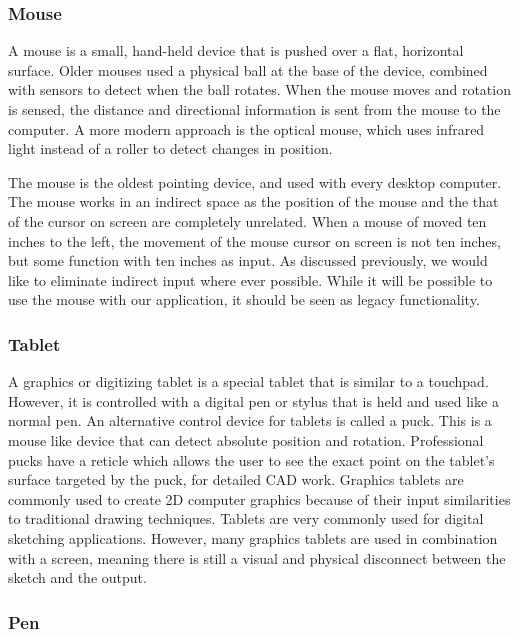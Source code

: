  \subsubsection{Mouse}
 A mouse is a small, hand-held device that is pushed over a flat, horizontal surface.
 Older mouses used a physical ball at the base of the device, combined with sensors to detect when the ball rotates.
 When the mouse moves and rotation is sensed, the distance and directional information is sent from the mouse to the computer.
 A more modern approach is the optical mouse, which uses infrared light instead of a roller to detect changes in position.
 
 The mouse is the oldest pointing device, and used with every desktop computer.
 The mouse works in an indirect space as the position of the mouse and the that of the cursor on screen are completely unrelated.
 When a mouse of moved ten inches to the left, the movement of the mouse cursor on screen is not ten inches, but some function with ten inches as input.
 As discussed previously, we would like to eliminate indirect input where ever possible.
 While it will be possible to use the mouse with our application, it should be seen as legacy functionality.

 \subsubsection{Tablet}
 A graphics or digitizing tablet is a special tablet that is similar to a touchpad. 
 However, it is controlled with a digital pen or stylus that is held and used like a normal pen.
 An alternative control device for tablets is called a puck. 
 This is a mouse like device that can detect absolute position and rotation.
 Professional pucks have a reticle which allows the user to see the exact point on the tablet's surface targeted by the puck, for detailed CAD work.
 Graphics tablets are commonly used to create 2D computer graphics because of their input similarities to traditional drawing techniques.
 Tablets are very commonly used for digital sketching applications.
 However, many graphics tablets are used in combination with a screen, meaning there is still a visual and physical disconnect between the sketch and the output.
 
 \subsubsection{Pen}
 
